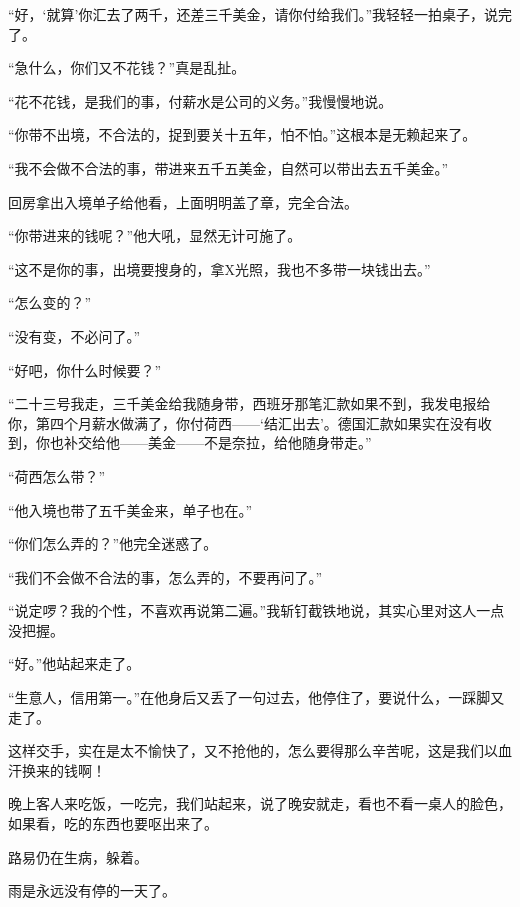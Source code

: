 \par “好，‘就算’你汇去了两千，还差三千美金，请你付给我们。”我轻轻一拍桌子，说完了。
\par “急什么，你们又不花钱？”真是乱扯。
\par “花不花钱，是我们的事，付薪水是公司的义务。”我慢慢地说。
\par “你带不出境，不合法的，捉到要关十五年，怕不怕。”这根本是无赖起来了。
\par “我不会做不合法的事，带进来五千五美金，自然可以带出去五千美金。”
\par 回房拿出入境单子给他看，上面明明盖了章，完全合法。
\par “你带进来的钱呢？”他大吼，显然无计可施了。
\par “这不是你的事，出境要搜身的，拿X光照，我也不多带一块钱出去。”
\par “怎么变的？”
\par “没有变，不必问了。”
\par “好吧，你什么时候要？”
\par “二十三号我走，三千美金给我随身带，西班牙那笔汇款如果不到，我发电报给你，第四个月薪水做满了，你付荷西——‘结汇出去’。德国汇款如果实在没有收到，你也补交给他——美金——不是奈拉，给他随身带走。”
\par “荷西怎么带？”
\par “他入境也带了五千美金来，单子也在。”
\par “你们怎么弄的？”他完全迷惑了。
\par “我们不会做不合法的事，怎么弄的，不要再问了。”
\par “说定啰？我的个性，不喜欢再说第二遍。”我斩钉截铁地说，其实心里对这人一点没把握。
\par “好。”他站起来走了。
\par “生意人，信用第一。”在他身后又丢了一句过去，他停住了，要说什么，一踩脚又走了。
\par 这样交手，实在是太不愉快了，又不抢他的，怎么要得那么辛苦呢，这是我们以血汗换来的钱啊！
\par 晚上客人来吃饭，一吃完，我们站起来，说了晚安就走，看也不看一桌人的脸色，如果看，吃的东西也要呕出来了。
\par 路易仍在生病，躲着。
\par 雨是永远没有停的一天了。

